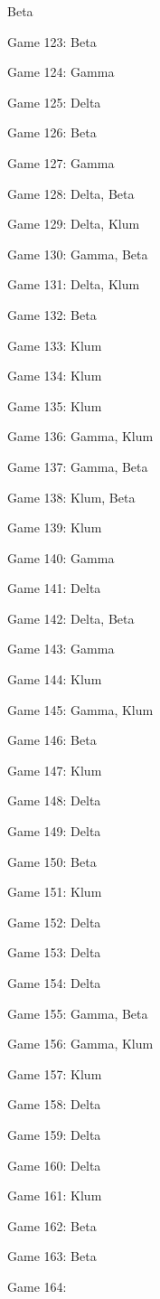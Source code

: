 \documentclass{article}
\begin{document}
\begin{multicols}{3}
\begin{compactitem}
Beta
\item Game 123:
Beta
\item Game 124:
Gamma
\item Game 125:
Delta
\item Game 126:
Beta
\item Game 127:
Gamma
\item Game 128:
Delta, Beta
\item Game 129:
Delta, Klum
\item Game 130:
Gamma, Beta
\item Game 131:
Delta, Klum
\item Game 132:
Beta
\item Game 133:
Klum
\item Game 134:
Klum
\item Game 135:
Klum
\item Game 136:
Gamma, Klum
\item Game 137:
Gamma, Beta
\item Game 138:
Klum, Beta
\item Game 139:
Klum
\item Game 140:
Gamma
\item Game 141:
Delta
\item Game 142:
Delta, Beta
\item Game 143:
Gamma
\item Game 144:
Klum
\item Game 145:
Gamma, Klum
\item Game 146:
Beta
\item Game 147:
Klum
\item Game 148:
Delta
\item Game 149:
Delta
\item Game 150:
Beta
\item Game 151:
Klum
\item Game 152:
Delta
\item Game 153:
Delta
\item Game 154:
Delta
\item Game 155:
Gamma, Beta
\item Game 156:
Gamma, Klum
\item Game 157:
Klum
\item Game 158:
Delta
\item Game 159:
Delta
\item Game 160:
Delta
\item Game 161:
Klum
\item Game 162:
Beta
\item Game 163:
Beta
\item Game 164:

\end{compactitem}
\end{multicols}
\end{document}
